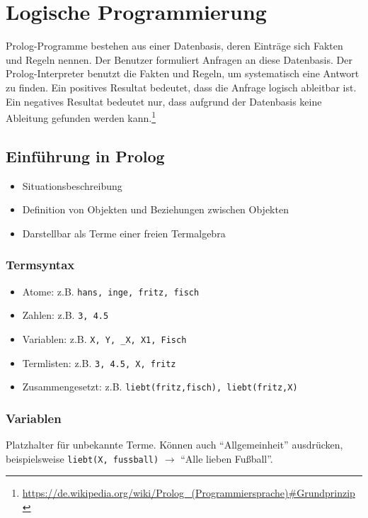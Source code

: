 \section{Logische Programmierung}
Prolog-Programme bestehen aus einer Datenbasis, deren Einträge sich Fakten und Regeln nennen. Der Benutzer formuliert Anfragen an diese Datenbasis. Der Prolog-Interpreter benutzt die Fakten und Regeln, um systematisch eine Antwort zu finden. Ein positives Resultat bedeutet, dass die Anfrage logisch ableitbar ist. Ein negatives Resultat bedeutet nur, dass aufgrund der Datenbasis keine Ableitung gefunden werden kann.\footnote{\url{https://de.wikipedia.org/wiki/Prolog_(Programmiersprache)\#Grundprinzip}}

\subsection{Einführung in Prolog}
\begin{itemize}
	\item Situationsbeschreibung
	\item Definition von Objekten und Beziehungen zwischen Objekten
	\item Darstellbar als Terme einer freien Termalgebra
\end{itemize}

\subsubsection{Termsyntax}
\begin{itemize}
	\item Atome: z.B. \texttt{hans, inge, fritz, fisch}
	\item Zahlen: z.B. \texttt{3, 4.5}
	\item Variablen: z.B. \texttt{X, Y, \_X, X1, Fisch}
	\item Termlisten: z.B. \texttt{3, 4.5, X, fritz}
	\item Zusammengesetzt: z.B. \texttt{liebt(fritz,fisch), liebt(fritz,X)}
\end{itemize}

\subsubsection{Variablen}
Platzhalter für unbekannte Terme. Können auch "`Allgemeinheit"' ausdrücken, beispielsweise \texttt{liebt(X, fussball)} \(\rightarrow\) "`Alle lieben Fußball"'.

